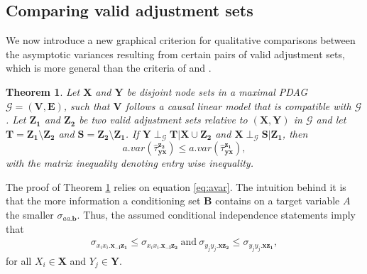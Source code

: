 \documentclass[11pt,a4paper]{article}
\newtheorem{Theorem}[Satz]{Theorem}
\theoremstyle{definition}
\theoremstyle{remark}
\newcommand{\mpdag}{maximal PDAG}
\newcommand{\g}[1][G]{\mathcal{#1}}
\newcommand{\vsp}{\vspace{.2cm}}
\begin{document}




\subsection{Comparing valid adjustment sets}



\vsp We now introduce a new graphical criterion for qualitative comparisons between the asymptotic variances resulting from certain pairs of valid adjustment sets, which is more general than the criteria of \citet{kuroki2003covariate} and \cite{kuroki2004selection}.


\begin{Theorem}
	Let $\mathbf{X}$ and $\mathbf{Y}$ be disjoint node sets in a \mpdag{} $\g = (\mathbf{V},\mathbf{E})$, such that $\mathbf{V}$ follows a causal linear model that is compatible with $\g$. Let $\mathbf{Z_1}$ and $\mathbf{Z_2}$ be two valid adjustment sets relative to $(\mathbf{X,Y})$ in $\g$ and let $\mathbf{T}=\mathbf{Z_1} \setminus \mathbf{Z_2}$ and $\mathbf{S}=\mathbf{Z_2} \setminus \mathbf{Z_1}$. 
	If $\mathbf{Y} \perp_{\g} \mathbf{T} | \mathbf{X} \cup \mathbf{Z_2} $ and $\mathbf{X} \perp_{\g} \mathbf{S} | \mathbf{Z_1}$,
	then 
	\[
	a.var(\hat{\tau}_{\mathbf{yx}}^{\mathbf{z_2}}) \leq 
	a.var(\hat{\tau}_{\mathbf{yx}}^{\mathbf{z_1}}),
	\]
	\label{cor:bignew12}
	with the matrix inequality denoting entry wise inequality.
	
\end{Theorem}

The proof of Theorem \ref{cor:bignew12} relies on equation \eqref{eq:avar}. The intuition behind it is that the more  information a conditioning set $\mathbf{B}$ contains on a target variable $A$ the smaller $\sigma_{aa.\mathbf{b}}$. 
Thus, the assumed conditional independence statements imply that 
\begin{align}
\sigma_{x_ix_i.\mathbf{x_{-i}\mathbf{z_1}}} \leq \sigma_{x_ix_i.\mathbf{x_{-i}\mathbf{z_2}}} \ \textrm{and} \
\sigma_{y_jy_j.\mathbf{xz_2}} \leq \sigma_{y_jy_j.\mathbf{xz_1}}, \nonumber 
\end{align}
for all $X_i \in \mathbf{X}$ and $Y_j \in \mathbf{Y}$.
\end{document}
